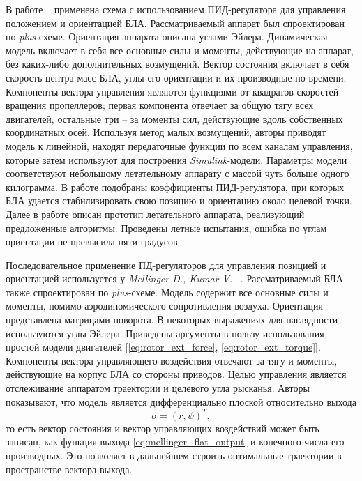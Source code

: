 \documentclass[a4paper,14pt,oneside,openany]{memoir}
\begin{document}
	В работе ~\cite{Li01} применена схема с использованием ПИД-регулятора для управления положением и ориентацией БЛА. Рассматриваемый аппарат был спроектирован по \textit{plus}-схеме. Ориентация аппарата описана углами Эйлера. Динамическая модель включает в себя все основные силы и моменты, действующие на аппарат, без каких-либо дополнительных возмущений. Вектор состояния включает в себя скорость центра масс БЛА, углы его ориентации и их производные по времени. Компоненты вектора управления являются функциями от квадратов скоростей вращения пропеллеров; первая компонента отвечает за общую тягу всех двигателей, остальные три -- за моменты сил, действующие вдоль собственных координатных осей. Используя метод малых возмущений, авторы приводят модель к линейной, находят передаточные функции по всем каналам управления, которые затем используют для построения \textit{Simulink}-модели. Параметры модели соответствуют небольшому летательному аппарату с массой чуть больше одного килограмма. В работе подобраны коэффициенты ПИД-регулятора, при которых БЛА удается стабилизировать свою позицию и ориентацию около целевой точки. Далее в работе описан прототип летательного аппарата, реализующий предложенные алгоритмы. Проведены летные испытания, ошибка по углам ориентации не превысила пяти градусов.
	
	Последовательное применение ПД-регуляторов для управления позицией и ориентацией используется у \textit{Mellinger D., Kumar V.} ~\cite{Mellinger01}. Рассматриваемый БЛА также спроектирован по \textit{plus}-схеме. Модель содержит все основные силы и моменты, помимо аэродиномического сопротивления воздуха. Ориентация представлена матрицами поворота. В некоторых выражениях для наглядности используются углы Эйлера. Приведены аргументы в пользу использования простой модели двигателей [\ref{eq:rotor_ext_force}, \ref{eq:rotor_ext_torque}]. Компоненты вектора управляющего воздействия отвечают за тягу и моменты, действующие на корпус БЛА со стороны приводов. Целью управления является отслеживание аппаратом траектории и целевого угла рысканья. Авторы показывают, что модель является дифференциально плоской относительно выхода
	\begin{equation} \label{eq:mellinger_flat_output}
	\sigma = (r,\psi)^T,
	\end{equation}
	то есть вектор состояния и вектор управляющих воздействий может быть записан, как функция выхода  \ref{eq:mellinger_flat_output} и конечного числа его производных.
	Это позволяет в дальнейшем строить оптимальные траектории в пространстве вектора выхода.
	
\end{document}
